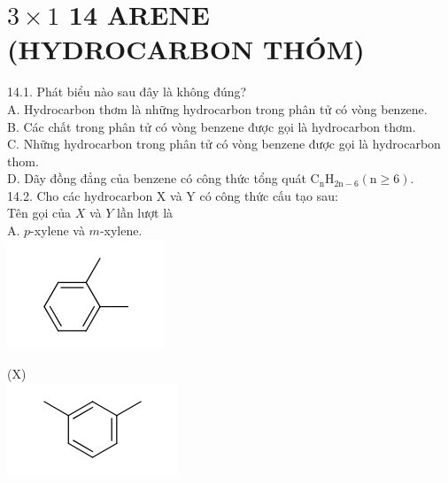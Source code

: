 \documentclass[10pt]{article}
\begin{document}
\section*{$3 \times 1$ 14 ARENE (HYDROCARBON THÓM)}
14.1. Phát biểu nào sau đây là không đúng?\\
A. Hydrocarbon thơm là những hydrocarbon trong phân tử có vòng benzene.\\
B. Các chất trong phân tử có vòng benzene được gọi là hydrocarbon thơm.\\
C. Những hydrocarbon trong phân tử có vòng benzene được gọi là hydrocarbon thom.\\
D. Dãy đồng đẳng của benzene có công thức tổng quát $\mathrm{C}_{\mathrm{n}} \mathrm{H}_{2 \mathrm{n}-6}(\mathrm{n} \geq 6)$.\\
14.2. Cho các hydrocarbon X và Y có công thức cấu tạo sau:\\
Tên gọi của $X$ và $Y$ lần lượt là\\
A. $p$-xylene và $m$-xylene.\\
\includegraphics{smile-e339a7316f6c6d22d6a7c5aa58b33e25d442896f}

(X)\\
\includegraphics{smile-478bfd0257a29f6b3a247b3940bf80fb4652db95}
\end{document}
